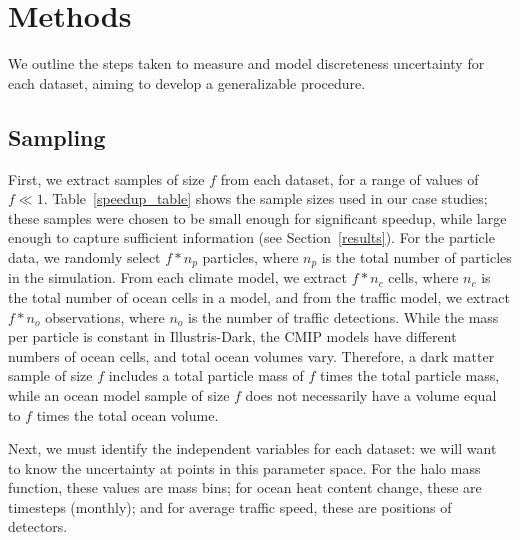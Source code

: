 \section{Methods}
We outline the steps taken to measure and model discreteness uncertainty for each dataset, aiming to develop a generalizable procedure. 

\subsection{Sampling}
First, we extract samples of size $f$ from each dataset, for a range of values of $f \ll 1$. Table~\ref{speedup_table} shows the sample sizes used in our case studies; these samples were chosen to be small enough for significant speedup, while large enough to capture sufficient information (see Section~\ref{results}). For the particle data, we randomly select $f * n_p$ particles, where $n_p$ is the total number of particles in the simulation. From each climate model, we extract $f * n_c$ cells, where $n_c$ is the total number of ocean cells in a model, and from the traffic model, we extract $f * n_o$ observations, where $n_o$ is the number of traffic detections. While the mass per particle is constant in Illustris-Dark, the CMIP models have different numbers of ocean cells, and total ocean volumes vary. Therefore, a dark matter sample of size $f$ includes a total particle mass of $f$ times the total particle mass, while an ocean model sample of size $f$ does not necessarily have a volume equal to $f$ times the total ocean volume.

Next, we must identify the independent variables for each dataset: 
we will want to know the uncertainty at points in this parameter space.
For the halo mass function, these values are mass bins; for ocean heat content change, these are timesteps (monthly); and for average traffic speed, these are positions of detectors.


